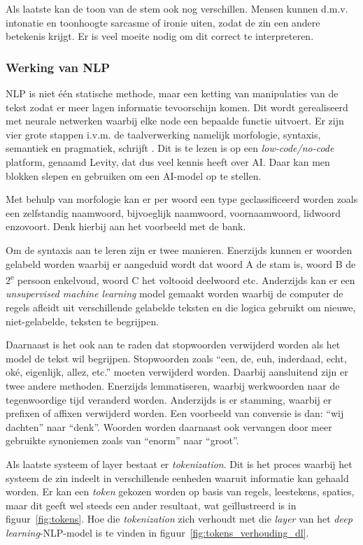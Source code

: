 Als laatste kan de toon van de stem ook nog verschillen. Mensen kunnen d.m.v. intonatie en toonhoogte sarcasme of ironie uiten, zodat de zin een andere betekenis krijgt. Er is veel moeite nodig om dit correct te interpreteren.

\subsubsection{Werking van NLP}
NLP is niet één statische methode, maar een ketting van manipulaties van de tekst zodat er meer lagen informatie tevoorschijn komen. Dit wordt gerealiseerd met neurale netwerken waarbij elke node een bepaalde functie uitvoert.
Er zijn vier grote stappen i.v.m. de taalverwerking namelijk morfologie, syntaxis, semantiek en pragmatiek, schrijft \textcite{Kleinings2022}. Dit is te lezen is op een \textit{low-code/no-code} platform, genaamd Levity, dat dus veel kennis heeft over AI. Daar kan men blokken slepen en gebruiken om een AI-model op te stellen.

Met behulp van morfologie kan er per woord een type geclassificeerd worden zoals een zelfstandig naamwoord, bijvoeglijk naamwoord, voornaamwoord, lidwoord enzovoort. Denk hierbij aan het voorbeeld met de bank.

Om de syntaxis aan te leren zijn er twee manieren. Enerzijds kunnen er woorden gelabeld worden waarbij er aangeduid wordt dat woord A de stam is, woord B de 2\textsuperscript{e} persoon enkelvoud, woord C het voltooid deelwoord etc. Anderzijds kan er een \textit{unsupervised machine learning} model gemaakt worden waarbij de computer de regels afleidt uit verschillende gelabelde teksten en die logica gebruikt om nieuwe, niet-gelabelde, teksten te begrijpen.

Daarnaast is het ook aan te raden dat stopwoorden verwijderd worden als het model de tekst wil begrijpen. Stopwoorden zoals ``een, de, euh, inderdaad, echt, oké, eigenlijk, allez, etc.'' moeten verwijderd worden. Daarbij aansluitend zijn er twee andere methoden. Enerzijds lemmatiseren, waarbij  werkwoorden naar de tegenwoordige tijd veranderd worden.
Anderzijds is er stamming, waarbij er prefixen of affixen verwijderd worden. Een voorbeeld van conversie is dan: ``wij dachten'' naar ``denk''. Woorden worden daarnaast ook vervangen door meer gebruikte synoniemen zoals van ``enorm'' naar ``groot''.

Als laatste systeem of layer bestaat er \textit{tokenization}. Dit is het proces waarbij het systeem de zin indeelt in verschillende eenheden waaruit informatie kan gehaald worden.
Er kan een \textit{token} gekozen worden op basis van regels, leestekens, spaties, maar dit geeft wel steeds een ander resultaat, wat geïllustreerd is in figuur~\ref{fig:tokens}. Hoe die \textit{tokenization} zich verhoudt met die \textit{layer} van het \textit{deep learning}-NLP-model is te vinden in figuur~\ref{fig:tokens_verhouding_dl}.

